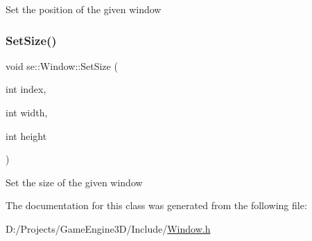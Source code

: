 Set the position of the given window \mbox{\label{classse_1_1_window_ac5e7a7985934606074e9c65f83f45260}} 
\subsubsection{\texorpdfstring{Set\+Size()}{SetSize()}}
{\footnotesize\ttfamily void se\+::\+Window\+::\+Set\+Size (\begin{DoxyParamCaption}\item[{int}]{index,  }\item[{int}]{width,  }\item[{int}]{height }\end{DoxyParamCaption})}

Set the size of the given window 

The documentation for this class was generated from the following file\+:\begin{DoxyCompactItemize}
\item 
D\+:/\+Projects/\+Game\+Engine3\+D/\+Include/\mbox{\hyperlink{_window_8h}{Window.\+h}}\end{DoxyCompactItemize}
